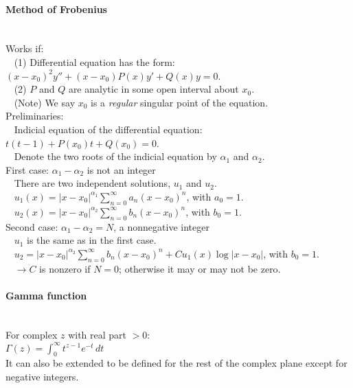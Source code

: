 \documentclass[10pt]{article}
\begin{document}
\paragraph{Method of Frobenius}\ \\
Works if:\\
$\phantom{x}$ (1) Differential equation has the form: $(x-x_0)^2y''+(x-x_0)P(x)y'+Q(x)y=0$.\\
$\phantom{x}$ (2) $P$ and $Q$ are analytic in some open interval about $x_0$.\\
$\phantom{x}$ (Note) We say $x_0$ is a {\it regular} singular point of the equation.\\
Preliminaries:\\
$\phantom{x}$ Indicial equation of the differential equation: $t(t-1)+P(x_0)t+Q(x_0)=0$.\\
$\phantom{x}$ Denote the two roots of the indicial equation by $\alpha_1$ and $\alpha_2$.\\
First case: $\alpha_1 - \alpha_2$ is not an integer\\
$\phantom{x}$ There are two independent solutions, $u_1$ and $u_2$.\\
$\phantom{x}$ $u_1(x) = |x - x_0|^{\alpha_1} \sum_{n=0}^\infty a_n(x-x_0)^n$, with $a_0 = 1$.\\
$\phantom{x}$ $u_2(x) = |x - x_0|^{\alpha_2} \sum_{n=0}^\infty b_n(x-x_0)^n$, with $b_0 = 1$.\\
Second case: $\alpha_1 - \alpha_2 = N$, a nonnegative integer\\
$\phantom{x}$ $u_1$ is the same as in the first case.\\
$\phantom{x}$ $u_2 = |x-x_0|^{\alpha_2}\sum_{n=0}^\infty b_n(x-x_0)^n + C u_1(x)\log|x-x_0|$, with $b_0 = 1$.\\
$\phantom{x}$ $\to C$ is nonzero if $N = 0$; otherwise it may or may not be zero.

\paragraph{Gamma function}\ \\
For complex $z$ with real part $> 0$:\\
$\Gamma(z) = \int_0^\infty t^{z-1} e^{-t}\, dt$\\
It can also be extended to be defined for the rest of the complex plane except for negative integers.
\end{document}

